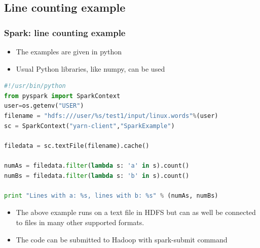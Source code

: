 \documentclass{beamer}
\begin{document}
\subsection{Line counting example}
\begin{frame}[fragile]
  \frametitle{Spark: line counting example}
  \begin{itemize}
    \item The examples are given in python
    \item Usual Python libraries, like numpy, can be used
  \end{itemize}
{\color{mycolorcode}
  \begin{lstlisting}[frame=single, basicstyle=\tiny,language=python]
#!/usr/bin/python
from pyspark import SparkContext
user=os.getenv("USER")
filename = "hdfs:///user/%s/test1/input/linux.words"%(user)
sc = SparkContext("yarn-client","SparkExample")

filedata = sc.textFile(filename).cache()

numAs = filedata.filter(lambda s: 'a' in s).count()
numBs = filedata.filter(lambda s: 'b' in s).count()

print "Lines with a: %s, lines with b: %s" % (numAs, numBs)
  \end{lstlisting}
}
  \begin{itemize}
  \item The above example runs on a text file in HDFS but can as well be connected to files in many other supported formats.
  \item The code can be submitted to Hadoop with {\color{mycolorcli}spark-submit} command
  \end{itemize}

\end{frame}
\end{document}
